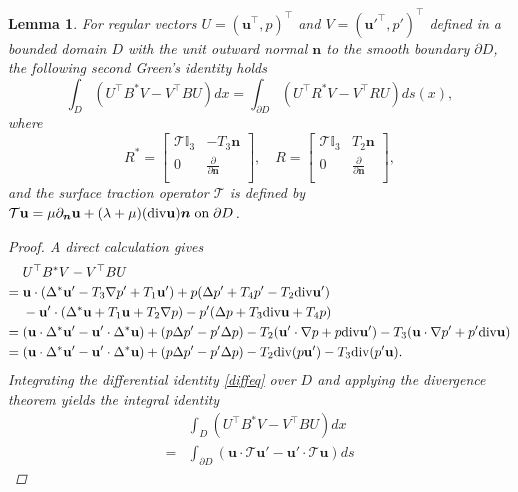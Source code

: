 \documentclass[11pt]{article}
\newcommand{\ds}{\displaystyle}
\newcommand{\no}{\nonumber}
\newcommand{\pa}{\partial}
\newcommand{\dive}{{\rm div}}
\newcommand{\la}{\lambda}
\newcommand{\bs}{\boldsymbol}
\newtheorem{lemma}[theorem]{Lemma}
\begin{document}
\begin{lemma}
For regular vectors $U=(\mathbf{u}^{\top},p)^{\top}$ and $V=(\mathbf{u}'^{\top},p')^{\top}$ defined in a 
bounded domain $D$ with the unit outward normal $\bs{n}$ to the smooth boundary $\pa D$, the following 
second Green’s identity holds
\begin{equation}\label{secondGreen}
\int_{D}(U^{\top}B^*V-V^{\top}BU)dx=\int_{\pa D}(U^{\top}R^*V-V^{\top}RU)ds(x),
\end{equation}
where 
\begin{equation}\label{R*R}
R^*=\begin{bmatrix}
\mathcal{T}\mathbb{I}_3 & -T_3\bs{n} \\
0 & \ds\frac{\pa}{\pa \bs{n}}\\
\end{bmatrix},\quad R=\begin{bmatrix}
\mathcal{T}\mathbb{I}_3 & T_2\bs{n} \\
0 & \ds\frac{\pa}{\pa \bs{n}}\\
\end{bmatrix},
\end{equation}
and the surface traction operator $\mathcal{T}$ is defined by $\mathcal{T}\mathbf{u}
=\mu\pa_{\bs{n}}\mathbf{u}+(\la+\mu)(\dive\mathbf{u})\bs{n}\;{\rm on}\;\pa D$.
\begin{proof}
A direct calculation gives
\begin{align}\no
&U^{\top}B^*V-V^{\top}BU\\ \no
=\;&\mathbf{u}\cdot(\Delta^*\mathbf{u}'-T_3\nabla p'+T_1\mathbf{u}')+p(\Delta p' +T_4 p'
-T_2 \dive \mathbf{u}') \\ \label{diffeq}
&-\mathbf{u}'\cdot(\Delta^*\mathbf{u}+T_1\mathbf{u}
+T_2\nabla p)-p'(\Delta p+T_3\dive\mathbf{u}+T_4p)\\ \no
=\;&(\mathbf{u}\cdot\Delta^*\mathbf{u}'-\mathbf{u}'\cdot\Delta^*\mathbf{u})+(p\Delta p'-p'\Delta p)
-T_2(\mathbf{u}'\cdot\nabla p+ p \dive \mathbf{u}')-T_3(\mathbf{u}\cdot\nabla p'+p'\dive\mathbf{u})\\ \no
=\;&(\mathbf{u}\cdot\Delta^*\mathbf{u}'-\mathbf{u}'\cdot\Delta^*\mathbf{u})+(p\Delta p'-p'\Delta p)-T_2 
\dive (p\mathbf{u}')-T_3\dive(p'\mathbf{u}).
\end{align}
Integrating the differential identity \eqref{diffeq} over $D$ and applying the divergence theorem 
yields the integral identity
\begin{align}\no
&\int_{D}(U^{\top}B^*V-V^{\top}BU)dx\\ \no
=&\int_{\pa D}(\mathbf{u}\cdot\mathcal{T}\mathbf{u}'-\mathbf{u}'\cdot\mathcal{T}\mathbf{u})ds

\end{align}
\end{proof}
\end{lemma}
\end{document}
